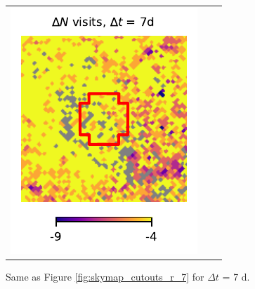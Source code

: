 \documentclass[preprintm,linenumbers]{aastex631}
\begin{document}
\begin{figure}
\begin{tabular}{  c c c}
				\includegraphics{results/skymaps_cutout/skymaps_cutout_delta_first_year_one_snap_v4_0_10yrs_db_noDD_noTwi_tscale-7_nside-256_doAllTemplateMetrics_reduceCount_r_GP_noDD_noTwi.pdf} \\
			\end{tabular}
			\caption{
				 Same as Figure \ref{fig:skymap_cutouts_r_7} for $\Delta t$ = 7 d.  
			}
   \label{fig:_skymap_cutouts_r_7}
		\end{figure}
        
\end{document}
